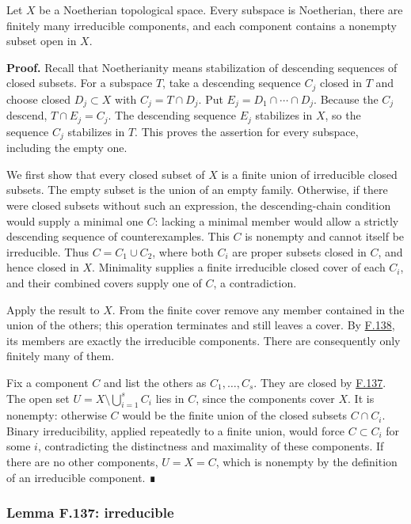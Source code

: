 \documentclass[11pt,a4paper,openany]{report}
\newcounter{none}
\begin{document}
Let \(X\) be a Noetherian topological space. Every subspace is Noetherian, there are finitely many irreducible components, and each component contains a nonempty subset open in \(X\).

\textbf{Proof.} Recall that Noetherianity means stabilization of descending sequences of closed subsets. For a subspace \(T\), take a descending sequence \(C_j\) closed in \(T\) and choose closed \(D_j\subset X\) with \(C_j=T\cap D_j\). Put \(E_j=D_1\cap\cdots\cap D_j\). Because the \(C_j\) descend, \(T\cap E_j=C_j\). The descending sequence \(E_j\) stabilizes in \(X\), so the sequence \(C_j\) stabilizes in \(T\). This proves the assertion for every subspace, including the empty one.

We first show that every closed subset of \(X\) is a finite union of irreducible closed subsets. The empty subset is the union of an empty family. Otherwise, if there were closed subsets without such an expression, the descending-chain condition would supply a minimal one \(C\): lacking a minimal member would allow a strictly descending sequence of counterexamples. This \(C\) is nonempty and cannot itself be irreducible. Thus \(C=C_1\cup C_2\), where both \(C_i\) are proper subsets closed in \(C\), and hence closed in \(X\). Minimality supplies a finite irreducible closed cover of each \(C_i\), and their combined covers supply one of \(C\), a contradiction.

Apply the result to \(X\). From the finite cover remove any member contained in the union of the others; this operation terminates and still leaves a cover. By \hyperref[AG-RG-S05-topology-lemma-pick-irreducible-components]{F.138}, its members are exactly the irreducible components. There are consequently only finitely many of them.

Fix a component \(C\) and list the others as \(C_1,\ldots,C_s\). They are closed by \hyperref[AG-RG-S05-topology-lemma-irreducible]{F.137}. The open set \(U=X\setminus\bigcup_{i=1}^s C_i\) lies in \(C\), since the components cover \(X\). It is nonempty: otherwise \(C\) would be the finite union of the closed subsets \(C\cap C_i\). Binary irreducibility, applied repeatedly to a finite union, would force \(C\subset C_i\) for some \(i\), contradicting the distinctness and maximality of these components. If there are no other components, \(U=X=C\), which is nonempty by the definition of an irreducible component. ∎

\label{AG-RG-S05-topology-lemma-irreducible}

\subsubsection{Lemma F.137: irreducible}\label{AG-RG-S05-lemma-f.137-irreducible}
\end{document}
